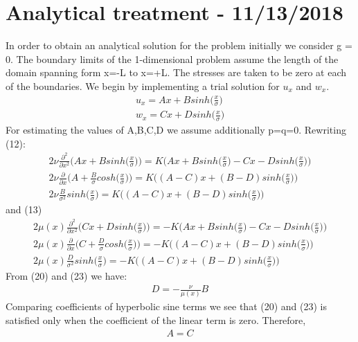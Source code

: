 \documentclass[a4paper,oneside,11pt]{report}
\begin{document}
\section*{Analytical treatment - 11/13/2018}
In order to obtain an analytical solution for the problem initially we consider g = 0. The boundary limits of the 1-dimensional problem assume the length of the domain spanning form x=-L to x=+L. The stresses are taken to be zero at each of the boundaries. We begin by implementing a trial solution for $u_x$ and $w_x$.
\begin{align}
u_x = Ax + Bsinh \Big ( \frac{x}{\sigma} \Big )\\
w_x = Cx + Dsinh \Big ( \frac{x}{\sigma} \Big )
\end{align}
For estimating the values of A,B,C,D we assume additionally p=q=0. 
Rewriting (12):
\begin{align}
2\nu\frac{\partial^{2}}{\partial x^2}\Big ( Ax + Bsinh\Big ( \frac{x}{\sigma} \Big ) \Big ) = K \Big ( Ax + Bsinh \Big ( \frac{x}{\sigma} \Big ) - Cx - Dsinh \Big ( \frac{x}{\sigma} \Big )  \Big )\\
2\nu\frac{\partial}{\partial x} \Big ( A + \frac{B}{\sigma}cosh\Big ( \frac{x}{\sigma} \Big ) \Big ) = K \Big ((A - C)x + (B - D)sinh\Big ( \frac{x}{\sigma} \Big ) )\\
2\nu\frac{B}{\sigma^2} sinh\Big ( \frac{x}{\sigma} \Big ) = K \Big ( (A - C)x + (B - D)sinh\Big ( \frac{x}{\sigma} \Big )\Big )
\end{align}
and (13)
\begin{align}
2\mu(x)\frac{\partial^{2}}{\partial x^2}\Big ( Cx + Dsinh\Big ( \frac{x}{\sigma} \Big ) \Big ) = -K \Big ( Ax + Bsinh \Big ( \frac{x}{\sigma} \Big ) - Cx - Dsinh \Big ( \frac{x}{\sigma} \Big )  \Big )\\
2\mu(x)\frac{\partial}{\partial x} \Big ( C + \frac{D}{\sigma}cosh\Big ( \frac{x}{\sigma} \Big ) \Big ) = -K \Big ((A - C)x + (B - D)sinh\Big ( \frac{x}{\sigma} \Big ) )\\
2\mu(x)\frac{D}{\sigma^2} sinh\Big ( \frac{x}{\sigma} \Big ) = -K \Big ( (A - C)x + (B - D)sinh\Big ( \frac{x}{\sigma} \Big )\Big )
\end{align}
From (20) and (23) we have:
\begin{align}
D = -\frac{\nu}{\mu(x)} B
\end{align}
Comparing coefficients of hyperbolic sine terms we see that (20) and (23) is satisfied only when the coefficient of the linear term is zero. Therefore,
\begin{align}
A = C
\end{align}
\end{document}

